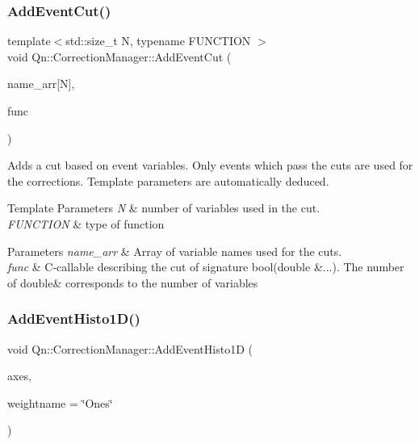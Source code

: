 \subsubsection{\texorpdfstring{Add\+Event\+Cut()}{AddEventCut()}}
{\footnotesize\ttfamily template$<$std\+::size\+\_\+t N, typename F\+U\+N\+C\+T\+I\+ON $>$ \\
void Qn\+::\+Correction\+Manager\+::\+Add\+Event\+Cut (\begin{DoxyParamCaption}\item[{const char $\ast$const (\&)}]{name\+\_\+arr\mbox{[}\+N\mbox{]},  }\item[{F\+U\+N\+C\+T\+I\+ON \&\&}]{func }\end{DoxyParamCaption})\hspace{0.3cm}{\ttfamily [inline]}}



Adds a cut based on event variables. Only events which pass the cuts are used for the corrections. Template parameters are automatically deduced. 


\begin{DoxyTemplParams}{Template Parameters}
{\em N} & number of variables used in the cut. \\
\hline
{\em F\+U\+N\+C\+T\+I\+ON} & type of function \\
\hline
\end{DoxyTemplParams}

\begin{DoxyParams}{Parameters}
{\em name\+\_\+arr} & Array of variable names used for the cuts. \\
\hline
{\em func} & C-\/callable describing the cut of signature bool(double \&...). The number of double\& corresponds to the number of variables \\
\hline
\end{DoxyParams}
\mbox{\label{classQn_1_1CorrectionManager_af88739b02d1092c71474b790751ab6a6}} 
\subsubsection{\texorpdfstring{Add\+Event\+Histo1\+D()}{AddEventHisto1D()}}
{\footnotesize\ttfamily void Qn\+::\+Correction\+Manager\+::\+Add\+Event\+Histo1D (\begin{DoxyParamCaption}\item[{const \mbox{\hyperlink{classQn_1_1Axis}{Qn\+::\+Axis}} \&}]{axes,  }\item[{const std\+::string \&}]{weightname = {\ttfamily \char`\"{}Ones\char`\"{}} }\end{DoxyParamCaption})}



